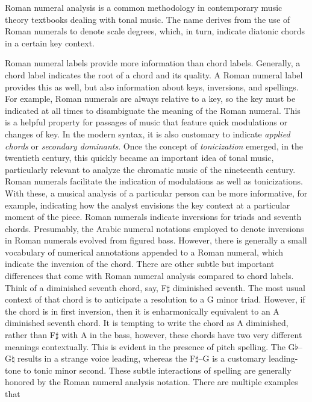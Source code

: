 Roman numeral analysis is a common methodology in
contemporary music theory textbooks dealing with tonal
music. The name derives from the use of Roman numerals to
denote scale degrees, which, in turn, indicate diatonic
chords in a certain key context.

Roman numeral labels provide more information than chord
labels. Generally, a chord label indicates the root of a
chord and its quality. A Roman numeral label provides this
as well, but also information about keys, inversions, and
spellings. For example, Roman numerals are always relative
to a key, so the key must be indicated at all times to
disambiguate the meaning of the Roman numeral. This is a
helpful property for passages of music that feature quick
modulations or changes of key. In the modern syntax, it is
also customary to indicate \emph{applied chords} or
\emph{secondary dominants}. Once the concept of
\emph{tonicization} emerged, in the twentieth century, this
quickly became an important idea of tonal music,
particularly relevant to analyze the chromatic music of the
nineteenth century. Roman numerals facilitate the indication
of modulations as well as tonicizations. With these, a
musical analysis of a particular person can be more
informative, for example, indicating how the analyst
envisions the key context at a particular moment of the
piece. Roman numerals indicate inversions for triads and
seventh chords. Presumably, the Arabic numeral notations
employed to denote inversions in Roman numerals evolved from
figured bass. However, there is generally a small vocabulary
of numerical annotations appended to a Roman numeral, which
indicate the inversion of the chord. There are other subtle
but important differences that come with Roman numeral
analysis compared to chord labels. Think of a diminished
seventh chord, say, F$\sharp$ diminished seventh. The most
usual context of that chord is to anticipate a resolution to
a G minor triad. However, if the chord is in first
inversion, then it is enharmonically equivalent to an A
diminished seventh chord. It is tempting to write the chord
as A diminished, rather than F$\sharp$ with A in the bass,
however, these chords have two very different meanings
contextually. This is evident in the presence of pitch
spelling. The G$\flat$--G$\natural$ results in a strange
voice leading, whereas the F$\sharp$--G is a customary
leading-tone to tonic minor second. These subtle
interactions of spelling are generally honored by the Roman
numeral analysis notation. There are multiple examples that
